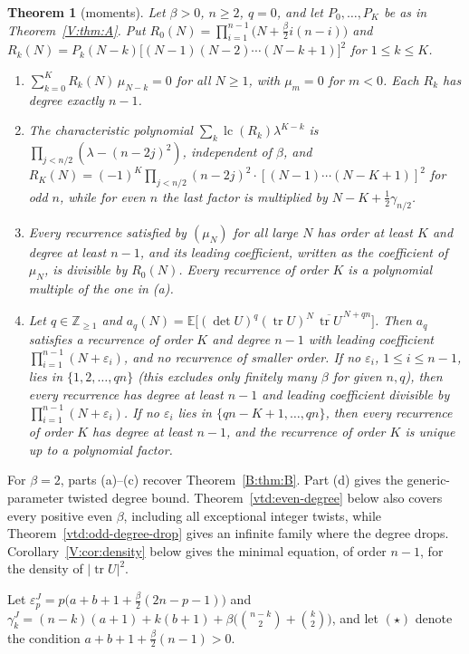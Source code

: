 \documentclass[11pt,a4paper]{article}
\newtheorem{theorem}{Theorem}[section]
\theoremstyle{definition}
\theoremstyle{remark}
\newcommand{\Z}{\mathbb Z}
\newcommand{\E}{\mathbb E}
\DeclareMathOperator{\lc}{lc}
\DeclareMathOperator{\tr}{tr}
\numberwithin{equation}{section}
\begin{document}
\begin{theorem}[moments]\label{V:thm:B}
Let $\beta>0$, $n\ge2$, $q=0$, and let $P_0,\dots,P_K$ be as in Theorem~\ref{V:thm:A}. Put $R_0(N)=\prod_{i=1}^{n-1}\bigl(N+\frac\beta2i(n-i)\bigr)$ and $R_k(N)=P_k(N-k)\bigl[(N-1)(N-2)\cdots(N-k+1)\bigr]^2$ for $1\le k\le K$.
\begin{enumerate}
\item[(a)] $\sum_{k=0}^{K}R_k(N)\,\mu_{N-k}=0$ for all $N\ge1$, with $\mu_m=0$ for $m<0$. Each $R_k$ has degree exactly $n-1$.
\item[(b)] The characteristic polynomial $\sum_k\lc(R_k)\lambda^{K-k}$ is $\prod_{j<n/2}(\lambda-(n-2j)^2)$, independent of $\beta$, and $R_K(N)=(-1)^K\prod_{j<n/2}(n-2j)^2\cdot[(N-1)\cdots(N-K+1)]^2$ for odd $n$, while for even $n$ the last factor is multiplied by $N-K+\frac12\gamma_{n/2}$.
\item[(c)] Every recurrence satisfied by $(\mu_N)$ for all large $N$ has order at least $K$ and degree at least $n-1$, and its leading coefficient, written as the coefficient of $\mu_N$, is divisible by $R_0(N)$. Every recurrence of order $K$ is a polynomial multiple of the one in (a).
\item[(d)] Let $q\in\Z_{\ge1}$ and $a_q(N)=\E\bigl[(\det U)^q(\tr U)^N\,\overline{\tr U}^{\,N+qn}\bigr]$. Then $a_q$ satisfies a recurrence of order $K$ and degree $n-1$ with leading coefficient $\prod_{i=1}^{n-1}(N+\varepsilon_i)$, and no recurrence of smaller order. If no $\varepsilon_i$, $1\le i\le n-1$, lies in $\{1,2,\dots,qn\}$ (this excludes only finitely many $\beta$ for given $n,q$), then every recurrence has degree at least $n-1$ and leading coefficient divisible by $\prod_{i=1}^{n-1}(N+\varepsilon_i)$. If no $\varepsilon_i$ lies in $\{qn-K+1,\dots,qn\}$, then every recurrence of order $K$ has degree at least $n-1$, and the recurrence of order $K$ is unique up to a polynomial factor.
\end{enumerate}
\end{theorem}

For $\beta=2$, parts (a)--(c) recover Theorem~\ref{B:thm:B}. Part (d) gives the generic-parameter twisted degree bound. Theorem~\ref{vtd:even-degree} below also covers every positive even $\beta$, including all exceptional integer twists, while Theorem~\ref{vtd:odd-degree-drop} gives an infinite family where the degree drops. Corollary~\ref{V:cor:density} below gives the minimal equation, of order $n-1$, for the density of $|\tr U|^2$.

Let $\varepsilon^J_p=p\bigl(a+b+1+\frac\beta2(2n-p-1)\bigr)$ and $\gamma^J_k=(n-k)(a+1)+k(b+1)+\beta\bigl(\binom{n-k}2+\binom k2\bigr)$, and let $(\star)$ denote the condition $a+b+1+\frac\beta2(n-1)>0$.
\end{document}
